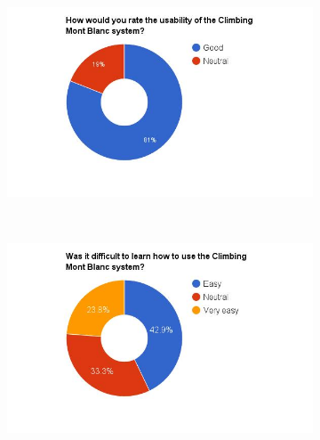 \begin{figure}
    \centering
    \hspace*{-1.5cm}
    \begin{subfigure}[h]{0.5\textwidth}
        \includegraphics[width=1.5\textwidth, height=1.0\textwidth]{results/usability_cmb.jpg}
        \caption{}
        \label{fig:cmb-usability}
    \end{subfigure}
    ~ %
    \hfill
    \begin{subfigure}[h]{0.5\textwidth}
        \includegraphics[width=1.5\textwidth, height=1.0\textwidth]{results/learn_cmb.jpg}
        \caption{}
        \label{fig:cmb-learn}
    \end{subfigure}


\end{figure}

